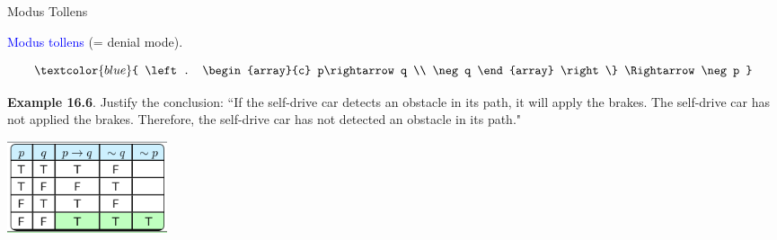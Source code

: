 \documentclass[aspectratio=169]{beamer}
\providecommand{\Blue}[1]{\textcolor{blue}{#1}}
\begin{document}
\begin{frame}[plain]{Modus Tollens}
  
  \Blue{Modus tollens} (= denial mode). 
    
      \[ \Blue{ \left. \begin{array}{c}
            p\rightarrow q \\  \neg q 
           \end{array} \right\}  \Rightarrow \neg p
           }
       \]
       \medskip
       \pause
       
 {\bf Example 16.6}. Justify the conclusion:
 ``If the self-drive car detects an obstacle in its path, 
 it will apply the brakes.
  The self-drive car has not applied the brakes.
  Therefore, the self-drive car has not detected an obstacle in its path."
  \pause 
    \medskip
    
     \begin{center}
       \includegraphics[height=2.7cm]{./img/lecture16-fig6.png}
     \end{center}
  
\end{frame}
\end{document}
